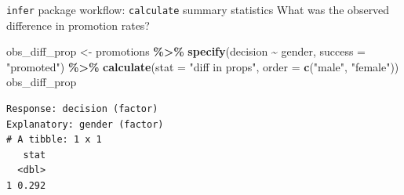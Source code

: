 \documentclass[
  ignorenonframetext,
]{beamer}
\newenvironment{Shaded}{\begin{snugshade}}{\end{snugshade}}
\newcommand{\AttributeTok}[1]{\textcolor[rgb]{0.13,0.29,0.53}{#1}}
\newcommand{\FunctionTok}[1]{\textcolor[rgb]{0.13,0.29,0.53}{\textbf{#1}}}
\newcommand{\NormalTok}[1]{#1}
\newcommand{\OtherTok}[1]{\textcolor[rgb]{0.56,0.35,0.01}{#1}}
\newcommand{\SpecialCharTok}[1]{\textcolor[rgb]{0.81,0.36,0.00}{\textbf{#1}}}
\newcommand{\StringTok}[1]{\textcolor[rgb]{0.31,0.60,0.02}{#1}}
\begin{document}
\begin{frame}[fragile]{\texttt{infer} package workflow:
\texttt{calculate} summary statistics}
\protect\hypertarget{infer-package-workflow-calculate-summary-statistics-2}{}
What was the observed difference in promotion rates?

\begin{Shaded}
\begin{Highlighting}[]
\NormalTok{obs\_diff\_prop }\OtherTok{\textless{}{-}}\NormalTok{ promotions }\SpecialCharTok{\%\textgreater{}\%} 
  \FunctionTok{specify}\NormalTok{(decision }\SpecialCharTok{\textasciitilde{}}\NormalTok{ gender, }\AttributeTok{success =} \StringTok{"promoted"}\NormalTok{) }\SpecialCharTok{\%\textgreater{}\%} 
  \FunctionTok{calculate}\NormalTok{(}\AttributeTok{stat =} \StringTok{"diff in props"}\NormalTok{, }
            \AttributeTok{order =} \FunctionTok{c}\NormalTok{(}\StringTok{"male"}\NormalTok{, }\StringTok{"female"}\NormalTok{))}
\NormalTok{obs\_diff\_prop}
\end{Highlighting}
\end{Shaded}

\begin{verbatim}
Response: decision (factor)
Explanatory: gender (factor)
# A tibble: 1 x 1
   stat
  <dbl>
1 0.292
\end{verbatim}
\end{frame}
\end{document}
